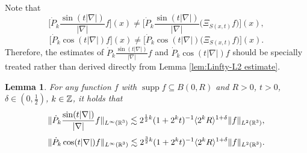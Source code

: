 \documentclass[11pt,twoside]{article}
\def\Z{\mathop{\mathbb Z\kern 0pt}\nolimits}
\def\R{\mathop{\mathbb R\kern 0pt}\nolimits}
\def\f{\frac}
\def\ls{\lesssim}
\newcommand{\w}[1]{\langle {#1} \rangle}
\newcommand{\pk}{\dot{P}_k}
\DeclareMathOperator{\supp}{supp}
\theoremstyle{plain}
\newtheorem{lemma}[theorem]{Lemma}
\theoremstyle{definition}
\numberwithin{equation}{section}
\begin{document}
		Note that
		\begin{equation*}
			\big[\pk \frac{\sin(t|\nabla|)}{|\nabla|} f\big](x) \neq \big[\pk \frac{\sin(t|\nabla|)}{|\nabla|} \big( \Xi_{S(x,t)} f \big)\big](x),
		\end{equation*}
		\begin{equation*}
			\big[\pk \cos(t|\nabla|) f\big](x) \neq \big[\pk \cos(t|\nabla|) \big( \Xi_{S(x,t)} f \big)\big](x).
		\end{equation*}
		Therefore, the estimates of $\pk \frac{\sin(t|\nabla|)}{|\nabla|} f$ and $\pk \cos(t|\nabla|) f$ should be specially treated rather than derived directly from Lemma \ref{lem:Linfty-L2 estimate}.

	\begin{lemma}\label{lem:local Linfty-L2 estimate1}
		For any function $f$ with $\supp f \subseteq B(0,R)$ and $R>0$, $t>0$, $\delta\in(0,\f12)$, $k\in \Z$, it holds that
		\begin{equation}\label{ineq:local Linfty-L2 estimate1}
			\|\pk\f{\sin(t|\nabla|)}{|\nabla|}f\|_{L^\infty(\R^3)} \ls 2^{\f12k}(1+2^kt)^{-1} \w{2^k R}^{1+\delta}\|f\|_{L^2(\R^3)},
		\end{equation}
		\begin{equation}\label{ineq:local Linfty-L2 estimate2}
			\|\pk\cos(t|\nabla|)f\|_{L^\infty(\R^3)} \ls 2^{\f32k}(1+2^kt)^{-1} \w{2^k R}^{1+\delta}\|f\|_{L^2(\R^3)}.
		\end{equation}
	\end{lemma}
\end{document}
